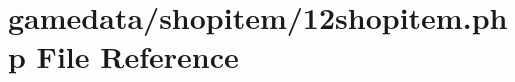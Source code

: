 \hypertarget{12shopitem_8php}{\section{gamedata/shopitem/12shopitem.php File Reference}
\label{12shopitem_8php}
}
